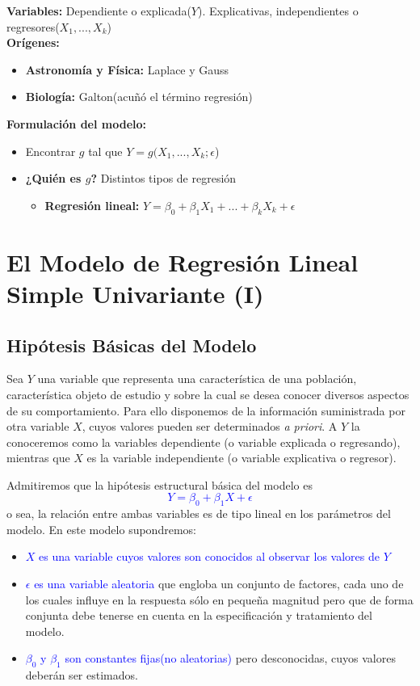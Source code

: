 \documentclass[10pt,a4paper]{book}
\begin{document}
\textbf{Variables:} Dependiente o explicada($Y$). Explicativas, independientes o regresores($X_1,...,X_k$)
\ \\

\textbf{Orígenes:}
\begin{itemize}
\item \textbf{Astronomía y Física:} Laplace y Gauss
\item \textbf{Biología:} Galton(acuñó el término regresión)
\end{itemize}
\textbf{Formulación del modelo:}
\begin{itemize}
\item Encontrar $g$ tal que $Y = g(X_1,...,X_k;\epsilon$)
\item \textbf{¿Quién es $g$?} Distintos tipos de regresión
\begin{itemize}
\item \textbf{Regresión lineal:} $Y = \beta_0 + \beta_1X_1 + ... + \beta_kX_k + \epsilon$
\end{itemize}
\end{itemize}

\chapter{El Modelo de Regresión Lineal Simple Univariante (I)}
	\section{Hipótesis Básicas del Modelo}
Sea $Y$ una variable que representa una característica de una población, característica objeto de estudio y sobre la cual se desea conocer diversos aspectos de su comportamiento. Para ello disponemos de la información suministrada por otra variable $X$, cuyos valores pueden ser determinados \textit{a priori}. A $Y$ la conoceremos como la variables dependiente (o variable explicada o regresando), mientras que $X$ es la
variable independiente (o variable explicativa o regresor).

Admitiremos que la hipótesis estructural básica del modelo es \textcolor{blue}{$$Y = \beta_0 + \beta_1X + \epsilon$$} o sea, la relación entre ambas variables es de tipo lineal en los parámetros del modelo. En este modelo supondremos:

\begin{itemize}
\item \textcolor{blue}{$X$ es una variable cuyos valores son conocidos al observar los valores de $Y$}
\item \textcolor{blue}{$\epsilon$ es una variable aleatoria} que engloba un conjunto de factores, cada uno de los cuales influye en la respuesta sólo en pequeña magnitud pero que de forma conjunta debe tenerse en cuenta en la especificación y tratamiento del modelo.
\item \textcolor{blue}{$\beta_0$ y $\beta_1$ son constantes fijas(no aleatorias)} pero desconocidas, cuyos valores deberán ser estimados.
\end{itemize}
\end{document}
